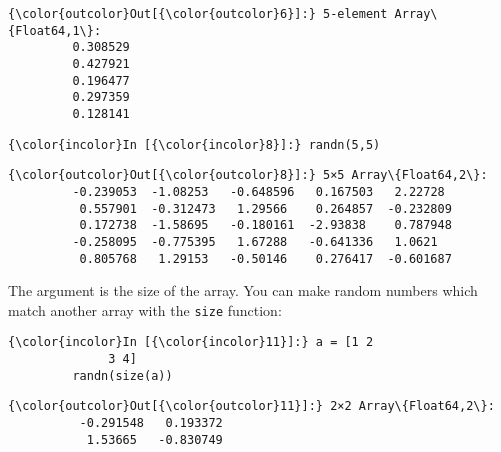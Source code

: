 \documentclass[11pt]{article}
\begin{document}
            \begin{Verbatim}[commandchars=\\\{\}]
{\color{outcolor}Out[{\color{outcolor}6}]:} 5-element Array\{Float64,1\}:
         0.308529
         0.427921
         0.196477
         0.297359
         0.128141
\end{Verbatim}
        
    \begin{Verbatim}[commandchars=\\\{\}]
{\color{incolor}In [{\color{incolor}8}]:} randn(5,5)
\end{Verbatim}

            \begin{Verbatim}[commandchars=\\\{\}]
{\color{outcolor}Out[{\color{outcolor}8}]:} 5×5 Array\{Float64,2\}:
         -0.239053  -1.08253   -0.648596   0.167503   2.22728 
          0.557901  -0.312473   1.29566    0.264857  -0.232809
          0.172738  -1.58695   -0.180161  -2.93838    0.787948
         -0.258095  -0.775395   1.67288   -0.641336   1.0621  
          0.805768   1.29153   -0.50146    0.276417  -0.601687
\end{Verbatim}
        
    The argument is the size of the array. You can make random numbers which
match another array with the \texttt{size} function:

    \begin{Verbatim}[commandchars=\\\{\}]
{\color{incolor}In [{\color{incolor}11}]:} a = [1 2
              3 4]
         randn(size(a))
\end{Verbatim}

            \begin{Verbatim}[commandchars=\\\{\}]
{\color{outcolor}Out[{\color{outcolor}11}]:} 2×2 Array\{Float64,2\}:
          -0.291548   0.193372
           1.53665   -0.830749
\end{Verbatim}
        

    
    
    
    
\end{document}
